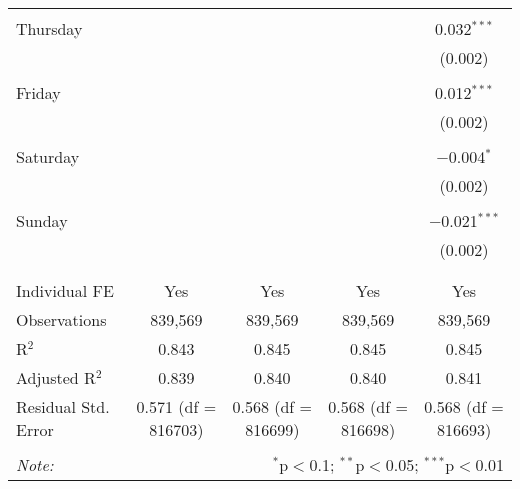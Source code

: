 \documentclass[
]{article}
\begin{document}
\begin{table}[!htbp]
{\begin{tabular}{@{\extracolsep{5pt}}lcccc}
  & & & & \\ 
 Thursday &  &  &  & 0.032$^{***}$ \\ 
  &  &  &  & (0.002) \\ 
  & & & & \\ 
 Friday &  &  &  & 0.012$^{***}$ \\ 
  &  &  &  & (0.002) \\ 
  & & & & \\ 
 Saturday &  &  &  & $-$0.004$^{*}$ \\ 
  &  &  &  & (0.002) \\ 
  & & & & \\ 
 Sunday &  &  &  & $-$0.021$^{***}$ \\ 
  &  &  &  & (0.002) \\ 
  & & & & \\ 
\hline \\[-1.8ex] 
Individual FE & Yes & Yes & Yes & Yes \\ 
Observations & 839,569 & 839,569 & 839,569 & 839,569 \\ 
R$^{2}$ & 0.843 & 0.845 & 0.845 & 0.845 \\ 
Adjusted R$^{2}$ & 0.839 & 0.840 & 0.840 & 0.841 \\ 
Residual Std. Error & 0.571 (df = 816703) & 0.568 (df = 816699) & 0.568 (df = 816698) & 0.568 (df = 816693) \\ 
\hline 
\hline \\[-1.8ex] 
\textit{Note:}  & \multicolumn{4}{r}{$^{*}$p$<$0.1; $^{**}$p$<$0.05; $^{***}$p$<$0.01} \\ 
\end{tabular}
} 
\end{table} 
\newpage
\end{document}
